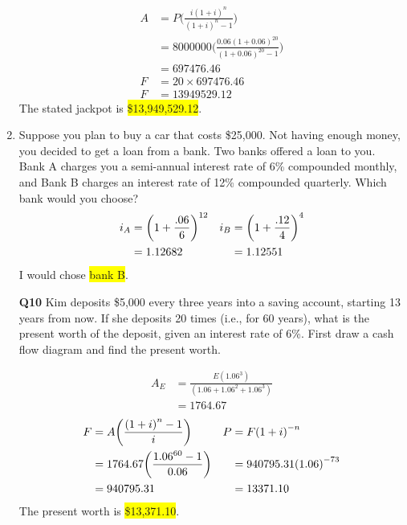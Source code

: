 \documentclass[12pt]{article}
\newcommand{\hilight}[1]{\colorbox{yellow}{#1}}
\begin{document}
\begin{enumerate}[label=\textbf{Q\arabic*}]
  \begin{align*}
  A &= P\bigg(\frac{i{(1+i)}^n}{{(1+i)}^n - 1}\bigg)\\
  &= 8000000\bigg(\frac{0.06{(1+0.06)}^{20}}{{(1+0.06)}^{20} - 1}\bigg)\\
  &= 697476.46\\
  F &= 20\times 697476.46\\
  F &= 13949529.12
  \end{align*}
  The stated jackpot is \hilight{\$13,949,529.12}.
\item Suppose you plan to buy a car that costs \$25,000. Not having enough money, you decided to get a loan from a bank. Two banks offered a loan to you. Bank A charges you a semi-annual interest rate of 6\% compounded monthly, and Bank B charges an interest rate of 12\% compounded quarterly. Which bank would you choose?
  \begin{align*}
  i_A &= {\bigg(1+\frac{.06}{6}\bigg)}^{12} &\vspace{40pt} i_B &= {\bigg(1+\frac{.12}{4}\bigg)}^{4}\\
  &= 1.12682 & &=1.12551
  \end{align*}
  I would chose \hilight{bank B}.
\end{enumerate}
\begin{itemize}
\item[{\bf Q10}] Kim deposits \$5,000 every three years into a saving account, starting 13 years from now. If she deposits 20 times (i.e., for 60 years), what is the present worth of the deposit, given an interest rate of 6\%. First draw a cash flow diagram and find the present worth.
  \begin{align*}
  A_E &= \frac{E({1.06}^3)}{(1.06 + {1.06}^2 + {1.06}^3)}\\
  &= 1764.67
  \end{align*}
  \begin{align*}
  F &= A\bigg(\frac{{(1+i)}^n - 1}{i}\bigg) &\vspace{40pt} P &= F{(1+i)}^{-n}\\
  &= 1764.67\bigg(\frac{{1.06}^{60} - 1}{0.06}\bigg) & &= 940795.31{(1.06)}^{-73}\\
  &= 940795.31 & &= 13371.10
  \end{align*}
  The present worth is \hilight{\$13,371.10}.
\end{itemize}
\end{document}
